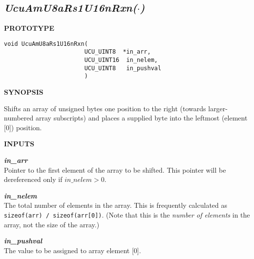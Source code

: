 \subsection[\emph{UcuAmU8aRs1U16nRxn(\protect\mbox{\protect$\cdot$})}]
           {\emph{UcuAmU8aRs1U16nRxn(\protect\mbox{\protect\boldmath $\cdot$})}}
\label{cami0:srsf0:srsh0}

%

\noindent\textbf{PROTOTYPE}
\begin {list}{}{\setlength{\leftmargin}{0.25in}\setlength{\topsep}{0.0in}}
\item
\begin{verbatim}
void UcuAmU8aRs1U16nRxn(
                       UCU_UINT8  *in_arr, 
                       UCU_UINT16  in_nelem, 
                       UCU_UINT8   in_pushval
                       )
\end{verbatim}
\end{list}
\vspace{2.8ex}

\noindent\textbf{SYNOPSIS}
\begin{list}{}{\setlength{\leftmargin}{0.25in}\setlength{\topsep}{0.0in}}
\item Shifts an array of unsigned bytes one position to the right
      (towards larger-numbered array subscripts) and places
      a supplied byte into the leftmost (element [0]) position.
\end{list}
\vspace{2.8ex}

\noindent\textbf{INPUTS}
\begin{list}{}{\setlength{\leftmargin}{0.5in}\setlength{\itemindent}{-0.25in}\setlength{\topsep}{0.0in}\setlength{\partopsep}{0.0in}}
\item \emph{\textbf{in\_arr}}\\
      Pointer to the first element of the array to be shifted.  This pointer will be
      dereferenced only if $in\_nelem > 0$.
\item \emph{\textbf{in\_nelem}}\\
      The total number of elements in the array.  This is frequently
      calculated as \texttt{sizeof(arr) / sizeof(arr[0])}.  (Note that this is
      the \emph{number of elements} in the array, not the size of the array.)
\item \emph{\textbf{in\_pushval}}\\
      The value to be assigned to array element [0].
\end{list}
\vspace{2.8ex}

